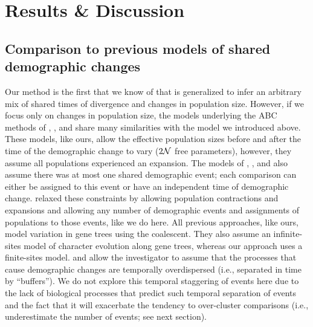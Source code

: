 


\section{Results \& Discussion}



\subsection{Comparison to previous models of shared demographic changes}

Our method is the first that we know of that is generalized to infer an
arbitrary mix of shared times of divergence and changes in population size.
However, if we focus only on changes in population size, the models underlying
the ABC methods of
\citet{Chan2014}, \citet{Xue2015}, and \citet{Gehara2017}
share many similarities with the model we introduced above.
These models, like ours, allow the effective population sizes before and after
the time of the demographic change to vary ($2\mathcal{N}$ free parameters),
however, they assume all populations experienced an expansion.
The models of \citet{Chan2014}, \citet{Xue2015}, and \citet{Gehara2017}
also assume there was at most one shared demographic event;
each comparison can either be assigned to this event or have an independent
time of demographic change.
\citet{Xue2017} relaxed these constraints by allowing population contractions
and expansions and allowing any number of demographic events and assignments of
populations to those events, like we do here.
All previous approaches, like ours, model variation in gene trees using the
coalescent.
They also assume an infinite-sites model of character evolution along gene
trees, whereas our approach uses a finite-sites model.
\citet{Gehara2017} and \citet{Xue2017}
allow the investigator to assume that the processes that cause demographic
changes are temporally overdispersed (i.e., separated in time by ``buffers'').
We do not explore this temporal staggering of events here due to the lack of
biological processes that predict such temporal separation of events and the
fact that it will exacerbate the tendency to over-cluster comparisons
(i.e., underestimate the number of events; see next section).

